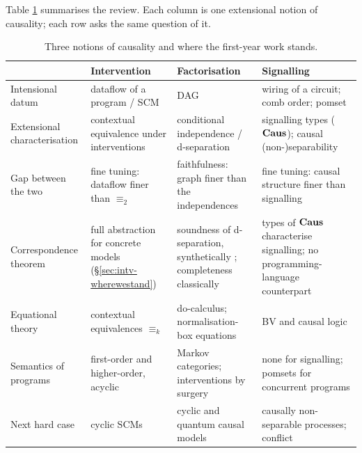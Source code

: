 Table \ref{tab:synthesis} summarises the review. Each column is one extensional notion of causality; each row asks the same question of it.

\begin{table}[ht]
\centering\small
\begin{tabularx}{\textwidth}{>{\raggedright\arraybackslash}p{2.6cm}>{\raggedright\arraybackslash}X>{\raggedright\arraybackslash}X>{\raggedright\arraybackslash}X}
\toprule
 & \textbf{Intervention} & \textbf{Factorisation} & \textbf{Signalling}\\
\midrule
Intensional datum & dataflow of a program / SCM & DAG & wiring of a circuit; comb order; pomset\\
Extensional characterisation & contextual equivalence under interventions & conditional independence / d-separation & signalling types ($\mathbf{Caus}$); causal (non-)separability\\
Gap between the two & fine tuning: dataflow finer than $\equiv_2$ & faithfulness: graph finer than the independences & fine tuning: causal structure finer than signalling \cite{barrett2019quantumcausalmodels}\\
Correspondence theorem & full abstraction for concrete models (\S\ref{sec:intv-wherewestand}) & soundness of d-separation, synthetically \cite{fritz2023dseparation}; completeness classically & types of $\mathbf{Caus}$ characterise signalling; no programming-language counterpart\\
Equational theory & contextual equivalences $\equiv_k$ & do-calculus; normalisation-box equations & BV and causal logic\\
Semantics of programs & first-order and higher-order, acyclic & Markov categories; interventions by surgery & none for signalling; pomsets for concurrent programs\\
Next hard case & cyclic SCMs & cyclic and quantum causal models & causally non-separable processes; conflict\\
\bottomrule
\end{tabularx}
\caption{Three notions of causality and where the first-year work stands.}\label{tab:synthesis}
\end{table}

